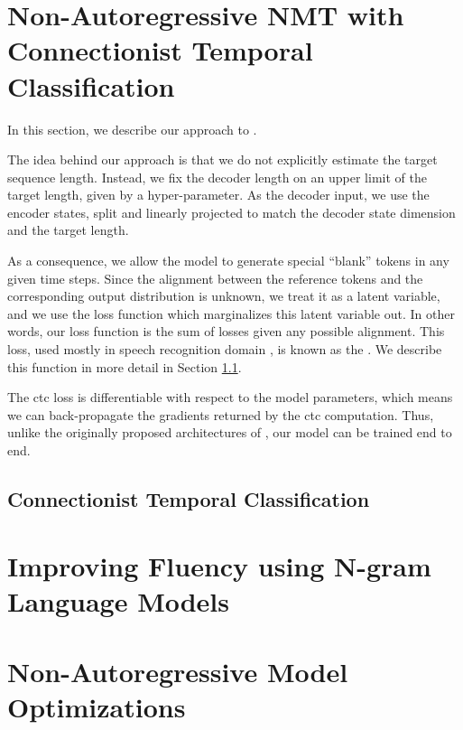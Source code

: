 \section{Non-Autoregressive NMT with Connectionist Temporal Classification}
\label{sec:nat-ctc}


In this section, we describe our approach to .

The idea behind our approach is that we do not explicitly estimate the target
sequence length. Instead, we fix the decoder length on an upper limit of the
target length, given by a hyper-parameter. As the decoder input, we use the
encoder states, split and linearly projected to match the decoder state
dimension and the target length.

As a consequence, we allow the model to generate special ``blank'' tokens in
any given time steps. Since the alignment between the reference tokens and the
corresponding output distribution is unknown, we treat it as a latent variable,
and we use the loss function which marginalizes this latent variable out. In
other words, our loss function is the sum of losses given any possible
alignment. This loss, used mostly in speech recognition domain
\citep{graves2006connectionist}, is known as the . We describe
this function in more detail in Section \ref{subsec:ctc}.

The \gls{ctc} loss is differentiable with respect to the model parameters,
which means we can back-propagate the gradients returned by the \gls{ctc}
computation. Thus, unlike the originally proposed architectures of
\citet{gu2017nonautoregressive}, our model can be trained end to end.


\subsection{Connectionist Temporal Classification}
\label{subsec:ctc}






\section{Improving Fluency using N-gram Language Models}
\label{sec:nat-lm}





\section{Non-Autoregressive Model Optimizations}
\label{sec:nat-opt}



